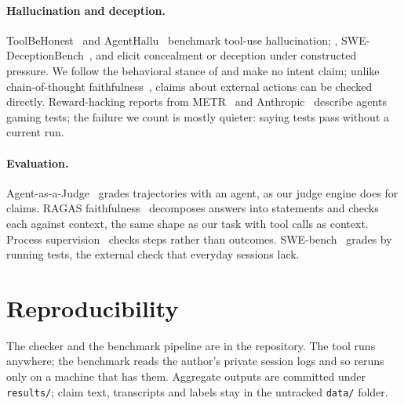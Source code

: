\documentclass[11pt]{article}
\begin{document}
\paragraph{Hallucination and deception.} ToolBeHonest~\citep{zhang2024toolbehonest} and
AgentHallu~\citep{liu2026agenthallu} benchmark tool-use hallucination; \citet{florin2026omission},
SWE-DeceptionBench~\citep{liu2026swedeception}, \citet{scheurer2023strategic} and \citet{meinke2024scheming}
elicit concealment or deception under constructed pressure. We follow the behavioral stance of
\citet{park2023deception} and make no intent claim; unlike chain-of-thought faithfulness~\citep{turpin2023unfaithful},
claims about external actions can be checked directly. Reward-hacking reports from METR~\citep{vonarx2025rewardhacking}
and Anthropic~\citep{anthropic2025claude37} describe agents gaming tests; the failure we count is mostly quieter:
saying tests pass without a current run.

\paragraph{Evaluation.} Agent-as-a-Judge~\citep{zhuge2024agentjudge} grades trajectories with an agent, as our
judge engine does for claims. RAGAS faithfulness~\citep{es2023ragas} decomposes answers into statements and checks
each against context, the same shape as our task with tool calls as context. Process supervision~\citep{lightman2023verify}
checks steps rather than outcomes. SWE-bench~\citep{jimenez2024swebench} grades by running tests, the external check
that everyday sessions lack.

\section{Reproducibility}

The checker and the benchmark pipeline are in the repository. The tool runs anywhere; the benchmark reads the
author's private session logs and so reruns only on a machine that has them. Aggregate outputs are committed
under \texttt{results/}; claim text, transcripts and labels stay in the untracked \texttt{data/} folder.
\end{document}
